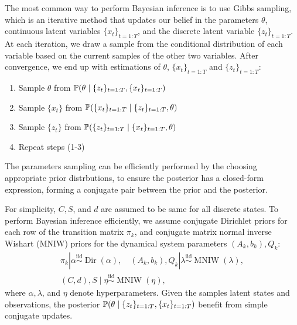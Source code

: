 The most common way to perform Bayesian inference is to use Gibbs sampling, which is an iterative method that updates our belief in the parameters $\theta$, continuous latent variables $\{x_{t}\}_{t=1:T}$, and the discrete latent variable $\{z_t\}_{t=1:T}$. At each iteration, we draw a sample from the conditional distribution of each variable based on the current samples of the other two variables. After convergence, we end up with estimations of $\theta$, $\{x_{t}\}_{t=1:T}$ and $\{z_t\}_{t=1:T}$:
\begin{enumerate}
  \item Sample $\theta$ from $\mathbb{P}(\theta \mid \{z_t\}_{t=1:T}, \{x_{t}\}_{t=1:T})$
  \item Sample $\{x_t\}$ from $\mathbb{P}(\{x_{t}\}_{t=1:T} \mid \{z_t\}_{t=1:T}, \theta)$
  \item Sample $\{z_t\}$ from $\mathbb{P}(\{z_{t}\}_{t=1:T} \mid \{x_t\}_{t=1:T}, \theta)$
 \item Repeat steps (1-3) 
\end{enumerate}
The parameters sampling can be efficiently performed by the choosing appropriate prior distrbutions, to ensure the posterior has a closed-form expression, forming a conjugate pair between the prior and the posterior.
 
For simplicity, $C, S$, and $d$ are assumed to be same for all discrete states. To perform Bayesian inference efficiently, we assume conjugate Dirichlet priors for each row of the transition matrix $\pi_{k}$, and conjugate matrix normal inverse Wishart (MNIW) priors for the dynamical system parameters $\left(A_{k}, b_{k}\right), Q_{k}$:
$$
\begin{gathered}
\pi_{k}\left|\alpha \stackrel{\mathrm{iid}}{\sim} \operatorname{Dir}(\alpha), \quad\left(A_{k}, b_{k}\right), Q_{k}\right| \lambda \stackrel{\mathrm{iid}}{\sim} \operatorname{MNIW}(\lambda), \\
\left(C, d\right), S \mid \eta \stackrel{\mathrm{iid}}{\sim} \operatorname{MNIW}(\eta),
\end{gathered}
$$
where $\alpha, \lambda$, and $\eta$ denote hyperparameters. 
Given the samples latent states and observations, the posterior $\mathbb{P}(\theta \mid \{z_t\}_{t=1:T}, \{x_{t}\}_{t=1:T})$ benefit from simple conjugate updates. 


